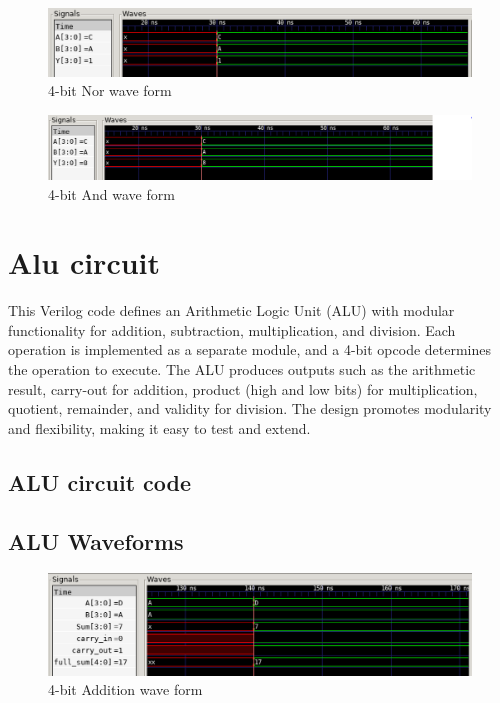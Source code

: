 \documentclass[12pt]{article}
\begin{document}
\begin{figure}[H]
    \centering 
    \includegraphics[width = 1.0\textwidth]{pictures/4bitNor.PNG}
    \caption{4-bit Nor wave form}
    \label{fig:enter-label}
    \end{figure}   

\begin{figure}[H]
    \centering 
    \includegraphics[width = 1.0\textwidth]{pictures/4bitAnd.PNG}
    \caption{4-bit And wave form}
    \label{fig:enter-label}
    \end{figure} 


\section{Alu circuit}
This Verilog code defines an Arithmetic Logic Unit (ALU) with modular functionality for addition, subtraction, multiplication, and division. Each operation is implemented as a separate module, and a 4-bit opcode determines the operation to execute. The ALU produces outputs such as the arithmetic result, carry-out for addition, product (high and low bits) for multiplication, quotient, remainder, and validity for division. The design promotes modularity and flexibility, making it easy to test and extend.
\subsection{ALU circuit code}


\subsection{ALU Waveforms}
\begin{figure}[H]
    \centering 
   \includegraphics[width = 1.0\textwidth]{pictures/4bitAddition.PNG}
    \caption{4-bit Addition wave form}
    \label{fig:enter-label}
    \end{figure}
\end{document}
